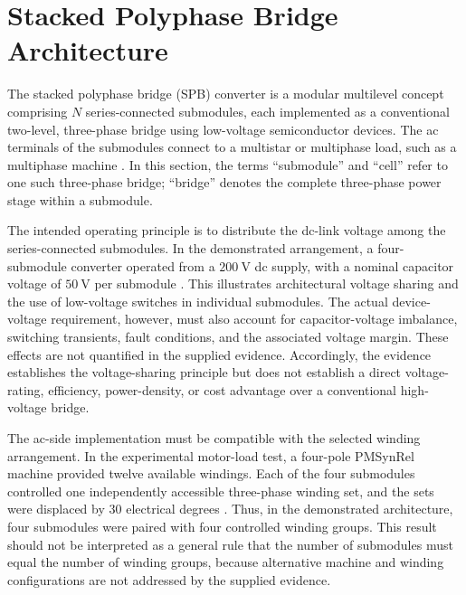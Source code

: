 \section{Stacked Polyphase Bridge Architecture}

The stacked polyphase bridge (SPB) converter is a modular multilevel concept comprising \(N\) series-connected submodules, each implemented as a conventional two-level, three-phase bridge using low-voltage semiconductor devices. The ac terminals of the submodules connect to a multistar or multiphase load, such as a multiphase machine \cite{Jin2017}. In this section, the terms ``submodule'' and ``cell'' refer to one such three-phase bridge; ``bridge'' denotes the complete three-phase power stage within a submodule.

The intended operating principle is to distribute the dc-link voltage among the series-connected submodules. In the demonstrated arrangement, a four-submodule converter operated from a \(200~\mathrm{V}\) dc supply, with a nominal capacitor voltage of \(50~\mathrm{V}\) per submodule \cite{Jin2017}. This illustrates architectural voltage sharing and the use of low-voltage switches in individual submodules. The actual device-voltage requirement, however, must also account for capacitor-voltage imbalance, switching transients, fault conditions, and the associated voltage margin. These effects are not quantified in the supplied evidence. Accordingly, the evidence establishes the voltage-sharing principle but does not establish a direct voltage-rating, efficiency, power-density, or cost advantage over a conventional high-voltage bridge. %

The ac-side implementation must be compatible with the selected winding arrangement. In the experimental motor-load test, a four-pole PMSynRel machine provided twelve available windings. Each of the four submodules controlled one independently accessible three-phase winding set, and the sets were displaced by \(30\) electrical degrees \cite{Jin2017}. Thus, in the demonstrated architecture, four submodules were paired with four controlled winding groups. This result should not be interpreted as a general rule that the number of submodules must equal the number of winding groups, because alternative machine and winding configurations are not addressed by the supplied evidence. %

